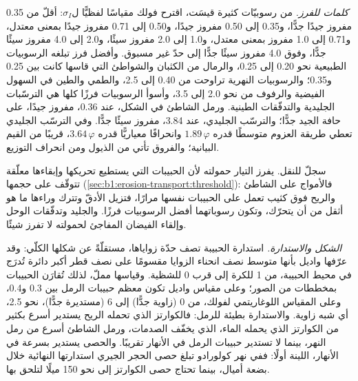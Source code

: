 \emph{كلمات للفرز.} من رسوبيّات كثيرة قيسَت، اقترح فولك مقياسًا لفظيًّا ل$\sigma_I$: أقلّ من \num{0.35} مفروز جيدًا جدًّا، و\num{0.35} إلى \num{0.50} مفروز جيدًا، و\num{0.50} إلى \num{0.71} مفروز جيدًا بمعنى معتدل، و\num{0.71} إلى \num{1.0} مفروز بمعنى معتدل، و\num{1.0} إلى \num{2.0} مفروز سيئًا، و\num{2.0} إلى \num{4.0} مفروز سيئًا جدًّا، وفوق \num{4.0} مفروز سيئًا جدًّا إلى حدّ غير مسبوق. وأفضل فرز تبلغه الرسوبيات الطبيعية نحو \num{0.20} إلى \num{0.25}، والرمال من الكثبان والشواطئ التي قاسها كانت بين \num{0.25} و\num{0.35}؛ والرسوبيات النهرية تراوحت من \num{0.40} إلى \num{2.5}، والطمي والطين في السهول الفيضية والرفوف من نحو \num{2.0} إلى \num{3.5}، وأسوأ الرسوبيات فرزًا كلها هي الترسّبات الجليدية والتدفّقات الطينية. ورمل الشاطئ في الشكل، عند \num{0.36}، مفروز جيدًا، على حافة  الجيد جدًّا؛ والترسّب الجليدي، عند \num{3.84}، مفروز سيئًا جدًّا. وفي الترسّب الجليدي تعطي طريقة العزوم متوسطًا قدره $1.89\,\varphi$ وانحرافًا معياريًّا قدره $3.64\,\varphi$، قريبًا من القيم البيانية؛ والفروق تأتي من الذيول ومن انحراف التوزيع.

 سجلّ للنقل. يفرز التيار حمولته لأن الحبيبات التي يستطيع تحريكها وإبقاءها معلّقة تتوقّف على حجمها (\cref{sec:b1:erosion-transport:threshold}): فالأمواج على الشاطئ والريح فوق كثيب تعمل على الحبيبات نفسها مرارًا، فتزيل الأدقّ وتترك وراءها ما هو أثقل من أن يتحرّك، وتكون رسوباتهما أفضل الرسوبيات فرزًا. والجليد وتدفّقات الوحل وإلقاء الفيضان المفاجئ لحمولته لا تفرز شيئًا.

\emph{الشكل والاستدارة.} استدارة الحبيبة تصف حدّة زواياها، مستقلّةً عن شكلها الكلّي: وقد عرّفها واديل بأنها متوسط نصف انحناء الزوايا مقسومًا على نصف قطر أكبر دائرة تُدرَج في محيط الحبيبة، من 1 للكرة إلى قرب 0 للشظية. وقياسها مملّ، لذلك تُقارَن الحبيبات بمخططات من الصور؛ وعلى مقياس واديل تكون معظم حبيبات الرمل بين \num{0.3} و\num{0.4}، وعلى المقياس اللوغاريتمي لفولك، من 0 (زاوية جدًّا) إلى 6 (مستديرة جدًّا)، نحو \num{2.5}، أي شبه زاوية. والاستدارة بطيئة للرمل: فالكوارتز الذي تحمله الريح يستدير أسرع بكثير من الكوارتز الذي يحمله الماء، الذي يخفّف الصدمات، ورمل الشاطئ أسرع من رمل النهر، بينما لا تستدير حبيبات الرمل في الأنهار تقريبًا. والحصى يستدير بسرعة في الأنهار، اللينة أولًا: ففي نهر كولورادو تبلغ حصى الحجر الجيري استدارتها النهائية خلال بضعة أميال، بينما تحتاج حصى الكوارتز إلى نحو 150 ميلًا لتلحق بها.

